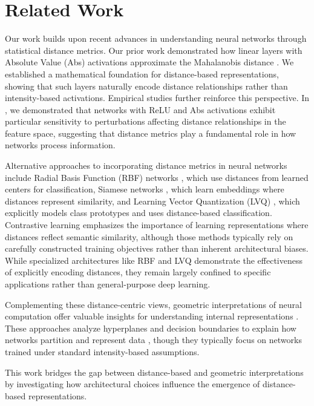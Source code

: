 \section{Related Work}
\label{sec:related_work}

Our work builds upon recent advances in understanding neural networks through statistical distance metrics. Our prior work \cite{oursland2024interpreting} demonstrated how linear layers with Absolute Value (Abs) activations approximate the Mahalanobis distance \cite{mahalanobis1936generalized}. We established a mathematical foundation for distance-based representations, showing that such layers naturally encode distance relationships rather than intensity-based activations. Empirical studies further reinforce this perspective. In \cite{oursland2024neural}, we demonstrated that networks with ReLU and Abs activations exhibit particular sensitivity to perturbations affecting distance relationships in the feature space, suggesting that distance metrics play a fundamental role in how networks process information.

Alternative approaches to incorporating distance metrics in neural networks include Radial Basis Function (RBF) networks \cite{broomhead1988radial, park1991universal}, which use distances from learned centers for classification, Siamese networks \cite{bromley1994signature, hadsell2006dimensionality}, which learn embeddings where distances represent similarity, and Learning Vector Quantization (LVQ) \cite{kohonen1995learning}, which explicitly models class prototypes and uses distance-based classification. Contrastive learning \cite{chen2020simple, he2020momentum} emphasizes the importance of learning representations where distances reflect semantic similarity, although those methods typically rely on carefully constructed training objectives rather than inherent architectural biases. While specialized architectures like RBF and LVQ demonstrate the effectiveness of explicitly encoding distances, they remain largely confined to specific applications rather than general-purpose deep learning.

Complementing these distance-centric views, geometric interpretations of neural computation offer valuable insights for understanding internal representations \cite{montavon2018methods, olah2017feature}. These approaches analyze hyperplanes and decision boundaries to explain how networks partition and represent data \cite{lipton2018mythos, erhan2009visualizing}, though they typically focus on networks trained under standard intensity-based assumptions.

This work bridges the gap between distance-based and geometric interpretations by investigating how architectural choices influence the emergence of distance-based representations.